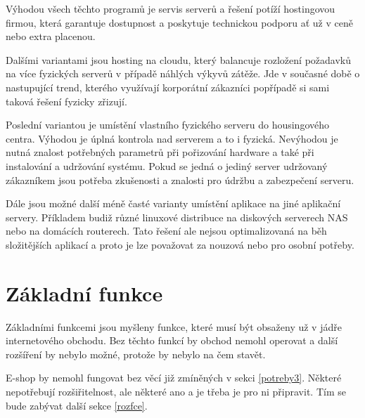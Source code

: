 \documentclass[11pt,twoside,a4paper]{book}
\begin{document}
Výhodou všech těchto programů je servis serverů a řešení potíží hostingovou firmou, která garantuje dostupnost a poskytuje technickou podporu ať už v ceně nebo extra placenou.

Dalšími variantami jsou hosting na cloudu, který balancuje rozložení požadavků na více fyzických serverů v případě náhlých výkyvů zátěže. Jde v současné době o nastupující trend, kterého využívají korporátní zákazníci popřípadě si sami taková řešení fyzicky zřizují.

Poslední variantou je umístění vlastního fyzického serveru do housingového centra. Výhodou je úplná kontrola nad serverem a to i fyzická. Nevýhodou je nutná znalost potřebných parametrů při pořizování hardware a také při instalování a udržování systému. Pokud se jedná o jediný server udržovaný zákazníkem jsou potřeba zkušenosti a znalosti pro údržbu a zabezpečení serveru.

\cite{hostingy}

Dále jsou možné další méně časté varianty umístění aplikace na jiné aplikační servery. Příkladem budiž různé linuxové distribuce na diskových serverech NAS nebo na domácích routerech. Tato řešení ale nejsou optimalizovaná na běh složitějších aplikací a proto je lze považovat za nouzová nebo pro osobní potřeby. 





\section{Základní funkce}

Základními funkcemi jsou myšleny funkce, které musí být obsaženy už v jádře internetového obchodu. Bez těchto funkcí by obchod nemohl operovat a další rozšíření by nebylo možné, protože by nebylo na čem stavět. 

E-shop by nemohl fungovat bez věcí již zmíněných v sekci \ref{potreby3}. Některé nepotřebují rozšiřitelnost, ale některé ano a je třeba je pro ni připravit. Tím se bude zabývat další sekce \ref{rozfce}.
\end{document}
